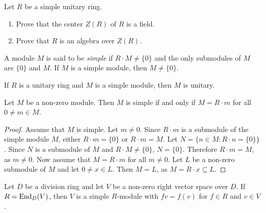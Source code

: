 \begin{exercise}
\label{xca:center_simple}
Let $R$ be a simple unitary ring. 
\begin{enumerate}
    \item Prove that the center $Z(R)$ of $R$ is a field.
    \item Prove that $R$ is an algebra over $Z(R)$. 
\end{enumerate}
\end{exercise}


\begin{definition}
    A module $M$ is said to be 
    \emph{simple} if $R\cdot M\ne\{0\}$ and 
    the only submodules of $M$ are $\{0\}$ and $M$.
    If $M$ is a simple module, then $M\ne\{0\}$.
\end{definition}

If $R$ is a unitary ring and $M$ is a simple 
module, then $M$ is unitary. 


\begin{lemma}
	\label{lemma:simple}
	Let $M$ be a non-zero module. Then $M$ is simple if and only if $M=R\cdot m$
	for all $0\ne m\in M$.
\end{lemma}

\begin{proof}
	Assume that $M$ is simple.  Let $m\ne 0$. Since $R\cdot m$ is a submodule of the simple 
	module $M$, either $R\cdot m=\{0\}$ or $R\cdot m=M$.  Let $N=\{n\in M:R\cdot n=\{0\}\}$. Since $N$ is a 
	submodule of $M$ and $R\cdot M\ne\{0\}$, $N=\{0\}$. Therefore $R\cdot m=M$, as $m\ne0$.
	Now assume that $M=R\cdot m$ for all $m\ne0$. Let $L$ be a non-zero submodule of 
	$M$ and let $0\ne x\in L$. Then $M=L$, as $M=R\cdot x\subseteq L$. 
\end{proof} 

\begin{example}
	Let $D$ be a division ring and let $V$ be a non-zero right vector space over $D$. If 
	$R=\operatorname{End}_D(V)$, then $V$ is a simple $R$-module with $fv=f(v)$ for
  $f\in R$ and 
	$v\in V$. 
\end{example}

